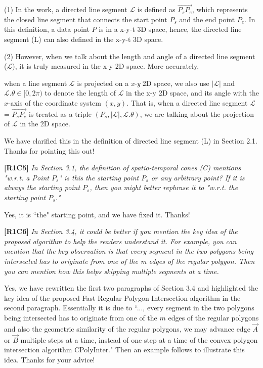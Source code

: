 \documentclass{letter}
\newcommand{\vv}{\overrightarrow}
\begin{document}
(1) In the work, a directed line segment $\mathcal{L}$ is defined as $\vv{P_{s}P_{e}}$, which represents the closed line segment that connects the start point $P_s$ and the end point $P_e$. In this definition, a data point $P$ is in a x-y-t 3D space, hence, the directed line segment (L) can also defined in the x-y-t 3D space.

(2) However, when we talk about the length and angle of a directed line segment ($\mathcal{L}$), it is truly measured in the x-y 2D space. More accurately, {when a line segment $\mathcal{L}$ is projected on a \emph{x-y} 2D space, we also use $|\mathcal{L}|$ and $\mathcal{L}.\theta\in [0, 2\pi)$ to denote the length of $\mathcal{L}$ in the x-y 2D space, and its angle with the $x$-axis of the coordinate system $(x, y)$.  That is, when a directed line segment $\mathcal{L}$ = $\vv{P_{s}P_{e}}$ is treated as a triple $(P_s, |\mathcal{L}|, \mathcal{L}.\theta)$, we are talking about the projection of $\mathcal{L}$ in the 2D space.

We have clarified this in the definition of directed line segment (L) in Section 2.1. Thanks for pointing this out!


\textbf{[R1C5]} \emph{In Section 3.1, the definition of spatio-temporal cones (C) mentions "w.r.t. a Point $P_s$" is this the starting point $P_s$ or any arbitrary point? If it is always the starting point $P_s$, then you might better rephrase it to "w.r.t. the starting point $P_s$."}

Yes, it is ``the" starting point, and we have fixed it. Thanks!

\textbf{[R1C6]} \emph{In Section 3.4, it could be better if you mention the key idea of the proposed algorithm to help the readers understand it. For example, you can mention that the key observation is that every segment in the two polygons being intersected has to originate from one of the m edges of the regular polygon. Then you can mention how this helps skipping multiple segments at a time.}

Yes, we have rewritten the first two paragraphs of Section 3.4 and highlighted the key idea of the proposed Fast Regular Polygon Intersection algorithm in the second paragraph.
{Essentially it is due to ``..., every segment in the two polygons being intersected has to originate from one of the $m$ edges of the regular polygons and also the geometric similarity of the regular polygons,
we may advance edge $\vv{A}$ or $\vv{B}$ multiple steps at a time, instead of one step at a time of the convex polygon intersection algorithm CPolyInter."} Then an example follows to illustrate this idea.  Thanks for your advice!



}
\end{document}
